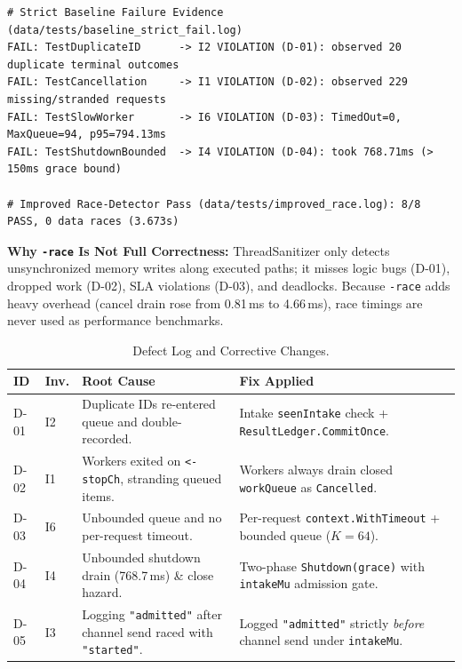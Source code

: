 \documentclass[11pt]{article}
\begin{document}
\begin{lstlisting}[style=logstyle]
# Strict Baseline Failure Evidence (data/tests/baseline_strict_fail.log)
FAIL: TestDuplicateID      -> I2 VIOLATION (D-01): observed 20 duplicate terminal outcomes
FAIL: TestCancellation     -> I1 VIOLATION (D-02): observed 229 missing/stranded requests
FAIL: TestSlowWorker       -> I6 VIOLATION (D-03): TimedOut=0, MaxQueue=94, p95=794.13ms
FAIL: TestShutdownBounded  -> I4 VIOLATION (D-04): took 768.71ms (> 150ms grace bound)

# Improved Race-Detector Pass (data/tests/improved_race.log): 8/8 PASS, 0 data races (3.673s)
\end{lstlisting}

\textbf{Why \texttt{-race} Is Not Full Correctness:} ThreadSanitizer only detects unsynchronized memory writes along executed paths; it misses logic bugs (D-01), dropped work (D-02), SLA violations (D-03), and deadlocks. Because \texttt{-race} adds heavy overhead (cancel drain rose from 0.81\,ms to 4.66\,ms), race timings are never used as performance benchmarks.

\begin{table}[htbp]
\centering
\caption{Defect Log and Corrective Changes.}
\footnotesize
\begin{tabularx}{\textwidth}{@{} l l >{\raggedright\arraybackslash}X >{\raggedright\arraybackslash}X @{}}
\toprule
\textbf{ID} & \textbf{Inv.} & \textbf{Root Cause} & \textbf{Fix Applied} \\
\midrule
D-01 & I2 & Duplicate IDs re-entered queue and double-recorded. & Intake \texttt{seenIntake} check + \texttt{ResultLedger.CommitOnce}. \\
D-02 & I1 & Workers exited on \texttt{<-stopCh}, stranding queued items. & Workers always drain closed \texttt{workQueue} as \texttt{Cancelled}. \\
D-03 & I6 & Unbounded queue and no per-request timeout. & Per-request \texttt{context.WithTimeout} + bounded queue ($K=64$). \\
D-04 & I4 & Unbounded shutdown drain (768.7\,ms) \& close hazard. & Two-phase \texttt{Shutdown(grace)} with \texttt{intakeMu} admission gate. \\
D-05 & I3 & Logging \texttt{"admitted"} after channel send raced with \texttt{"started"}. & Logged \texttt{"admitted"} strictly \textit{before} channel send under \texttt{intakeMu}. \\
\bottomrule
\end{tabularx}
\end{table}
\end{document}
